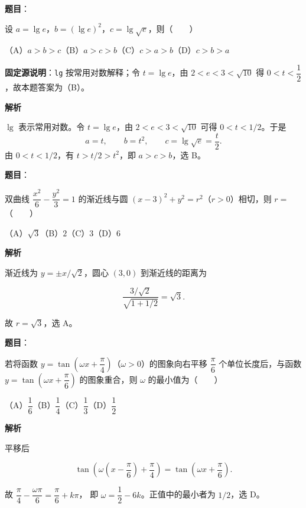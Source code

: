 \begin{answer}

\textbf{题目}：

设 $a=\lg e$，$b=(\lg e)^2$，$c=\lg\sqrt e$，则\mbox{（　　）}

（A）$a>b>c$\quad（B）$a>c>b$\quad（C）$c>a>b$\quad（D）$c>b>a$

\begin{gktip}
\textbf{固定源说明}：\texttt{lg} 按常用对数解释；令 $t=\lg e$，由 $2<e<3<\sqrt{10}$ 得 $0<t<\dfrac12$，故本题答案为（B）。
\end{gktip}

\textbf{解析}

$\lg$ 表示常用对数。令 $t=\lg e$，由 $2<e<3<\sqrt{10}$ 可得
$0<t<1/2$。于是
\nopagebreak[4]
\[
a=t,\qquad b=t^2,\qquad c=\lg\sqrt e=\frac t2.
\]
由 $0<t<1/2$，有 $t>t/2>t^2$，即 $a>c>b$，选 B。


\end{answer}
\begin{answer}

\textbf{题目}：

双曲线 $\dfrac{x^2}{6}-\dfrac{y^2}{3}=1$ 的渐近线与圆 $(x-3)^2+y^2=r^2$（$r>0$）相切，则 $r=$\mbox{（　　）}

（A）$\sqrt3$\quad（B）$2$\quad（C）$3$\quad（D）$6$

\textbf{解析}

渐近线为 $y=\pm x/\sqrt2$，圆心 $(3,0)$ 到渐近线的距离为

\nopagebreak[4]
\[
\frac{3/\sqrt2}{\sqrt{1+1/2}}=\sqrt3.
\]

故 $r=\sqrt3$，选 A。


\end{answer}
\begin{answer}

\textbf{题目}：

若将函数 $y=\tan\left(\omega x+\dfrac\pi4\right)$（$\omega>0$）的图象向右平移 $\dfrac\pi6$ 个单位长度后，与函数 $y=\tan\left(\omega x+\dfrac\pi6\right)$ 的图象重合，则 $\omega$ 的最小值为\mbox{（　　）}

（A）$\dfrac16$\quad（B）$\dfrac14$\quad（C）$\dfrac13$\quad（D）$\dfrac12$

\textbf{解析}

平移后

\nopagebreak[4]
\[
\tan\left(\omega\left(x-\frac\pi6\right)+\frac\pi4\right)
=\tan\left(\omega x+\frac\pi6\right).
\]

故 $\dfrac\pi4-\dfrac{\omega\pi}{6}=\dfrac\pi6+k\pi$，
即 $\omega=\dfrac12-6k$。正值中的最小者为 $1/2$，选 D。


\end{answer}

